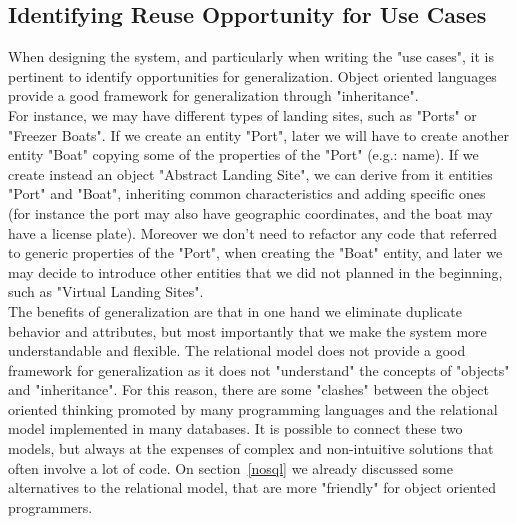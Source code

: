 \documentclass[11pt]{article} %
\begin{document}
\subsection{Identifying Reuse Opportunity for Use Cases}\label{reuse}
When designing the system, and particularly when writing the "use cases", it is pertinent to identify opportunities for generalization. Object oriented languages provide a good framework for generalization through "inheritance".\\
For instance, we may have different types of landing sites, such as "Ports" or "Freezer Boats". If we create an entity "Port", later we will have to create another entity "Boat" copying some of the properties of the "Port" (e.g.: name). If we create instead an object "Abstract Landing Site", we can derive from it entities "Port" and "Boat", inheriting  common characteristics and adding specific ones (for instance the port may also have geographic coordinates, and the boat may have a license plate). Moreover we don't need to refactor any code that referred to generic properties of the "Port", when creating the "Boat" entity, and later we may decide to introduce other entities that we did not planned in the beginning, such as "Virtual Landing Sites".\\
The benefits of generalization are that in one hand we eliminate duplicate behavior and attributes, but most importantly that we make the system more understandable and flexible. The relational model does not provide a good framework for generalization as it does not "understand" the concepts of "objects" and "inheritance". For this reason, there are some "clashes" between the object oriented thinking promoted by many programming languages and the relational model implemented in many databases. It is possible to connect these two models, but always at the expenses of complex and non-intuitive solutions that often involve a lot of code. On section~\ref{nosql} we already discussed some alternatives to the relational model, that are more "friendly" for object oriented programmers.
\end{document}
